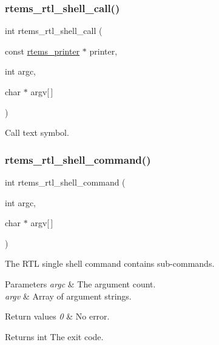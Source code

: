 \subsubsection{\texorpdfstring{rtems\_rtl\_shell\_call()}{rtems\_rtl\_shell\_call()}}
{\footnotesize\ttfamily int rtems\+\_\+rtl\+\_\+shell\+\_\+call (\begin{DoxyParamCaption}\item[{const \mbox{\hyperlink{structrtems__printer}{rtems\+\_\+printer}} $\ast$}]{printer,  }\item[{int}]{argc,  }\item[{char $\ast$}]{argv\mbox{[}$\,$\mbox{]} }\end{DoxyParamCaption})}

Call text symbol. \mbox{\label{rtl-shell_8c_aa548220d324834be6c5703605f7aa127}} 
\subsubsection{\texorpdfstring{rtems\_rtl\_shell\_command()}{rtems\_rtl\_shell\_command()}}
{\footnotesize\ttfamily int rtems\+\_\+rtl\+\_\+shell\+\_\+command (\begin{DoxyParamCaption}\item[{int}]{argc,  }\item[{char $\ast$}]{argv\mbox{[}$\,$\mbox{]} }\end{DoxyParamCaption})}

The R\+TL single shell command contains sub-\/commands.


\begin{DoxyParams}{Parameters}
{\em argc} & The argument count. \\
\hline
{\em argv} & Array of argument strings. \\
\hline
\end{DoxyParams}

\begin{DoxyRetVals}{Return values}
{\em 0} & No error. \\
\hline
\end{DoxyRetVals}
\begin{DoxyReturn}{Returns}
int The exit code. 
\end{DoxyReturn}
\mbox{\label{rtl-shell_8c_a1f9b3cb0aafe4ed009d797499b64e9e4}} 
